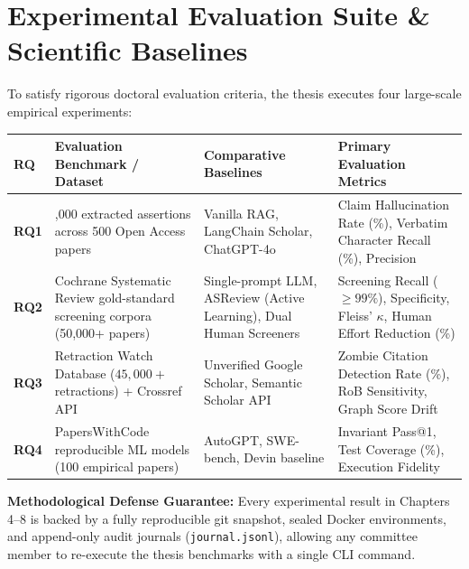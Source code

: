 \documentclass[10pt,a4paper]{article}
\newcommand{\inlinecode}[1]{\texttt{\small\color{tealDark}#1}}
\begin{document}
\vspace{-8pt}

\section{Experimental Evaluation Suite \& Scientific Baselines}

To satisfy rigorous doctoral evaluation criteria, the thesis executes four large-scale empirical experiments:

\vspace{-2pt}

\begin{table}[htbp]
\centering\scriptsize
\begin{tabularx}{\linewidth}{l>{\raggedright\arraybackslash}X>{\raggedright\arraybackslash}p{4.2cm}>{\raggedright\arraybackslash}p{4.5cm}}
\toprule
\textbf{RQ} & \textbf{Evaluation Benchmark / Dataset} & \textbf{Comparative Baselines} & \textbf{Primary Evaluation Metrics} \\
\midrule
\textbf{RQ1} & 10,000 extracted assertions across 500 Open Access papers & Vanilla RAG, LangChain Scholar, ChatGPT-4o & Claim Hallucination Rate (\%), Verbatim Character Recall (\%), Precision \\
\textbf{RQ2} & 20 Cochrane Systematic Review gold-standard screening corpora (50,000+ papers) & Single-prompt LLM, ASReview (Active Learning), Dual Human Screeners & Screening Recall ($\ge 99\%$), Specificity, Fleiss' $\kappa$, Human Effort Reduction (\%) \\
\textbf{RQ3} & Retraction Watch Database ($45,000+$ retractions) + Crossref API & Unverified Google Scholar, Semantic Scholar API & Zombie Citation Detection Rate (\%), RoB Sensitivity, Graph Score Drift \\
\textbf{RQ4} & PapersWithCode reproducible ML models (100 empirical papers) & AutoGPT, SWE-bench, Devin baseline & Invariant Pass@1, Test Coverage (\%), Execution Fidelity \\
\bottomrule
\end{tabularx}
\end{table}

\vspace{-4pt}

\begin{tcolorbox}[cardBox]
\textbf{Methodological Defense Guarantee:} Every experimental result in Chapters 4--8 is backed by a fully reproducible git snapshot, sealed Docker environments, and append-only audit journals (\inlinecode{journal.jsonl}), allowing any committee member to re-execute the thesis benchmarks with a single CLI command.
\end{tcolorbox}
\end{document}
